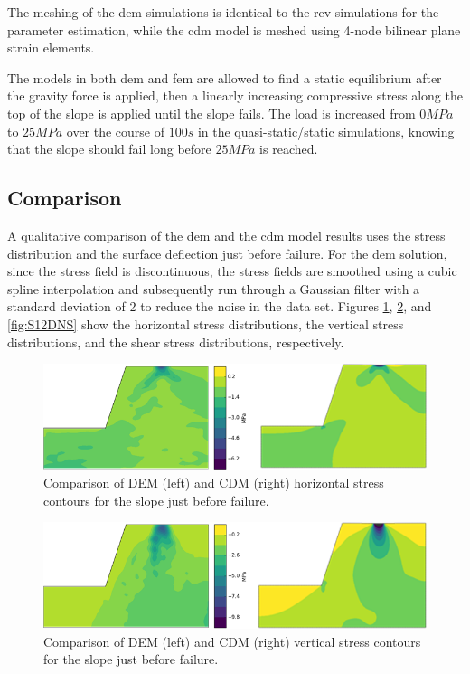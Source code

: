 The meshing of the \acrshort{dem} simulations is identical to the \acrshort{rev} simulations for the parameter estimation, while the \acrshort{cdm} model is meshed using 4-node bilinear plane strain elements.

The models in both \acrshort{dem} and \acrshort{fem} are allowed to find a static equilibrium after the gravity force is applied, then a linearly increasing compressive stress along the top of the slope is applied until the slope fails. The load is increased from $0MPa$ to $25 MPa$ over the course of $100s$ in the quasi-static/static simulations, knowing that the slope should fail long before $25MPa$ is reached.

\subsection{ Comparison}

A qualitative comparison of the \acrshort{dem} and the \acrshort{cdm} model results uses the stress distribution and the surface deflection just before failure. For the \acrshort{dem} solution, since the stress field is discontinuous, the stress fields are smoothed using a cubic spline interpolation and subsequently run through a Gaussian filter with a standard deviation of 2 to reduce the noise in the data set. Figures \ref{fig:S11DNS}, \ref{fig:S22DNS}, and \ref{fig:S12DNS} show the horizontal stress distributions, the vertical stress distributions, and the shear stress distributions, respectively.

\begin{figure}[!htb]
\begin{center}
\includegraphics[width=\textwidth]{figures/Chapter5/HorizontalStressContours}
\caption{{\label{fig:S11DNS} Comparison of DEM (left) and CDM (right) horizontal stress contours for the slope just before failure.%
}}
\end{center}
\end{figure}

\begin{figure}[!htb]
\begin{center}
\includegraphics[width=\textwidth]{figures/Chapter5/VerticalStressContours}
\caption{{\label{fig:S22DNS} Comparison of DEM (left) and CDM (right) vertical stress contours for the slope just before failure.%
}}
\end{center}
\end{figure}

